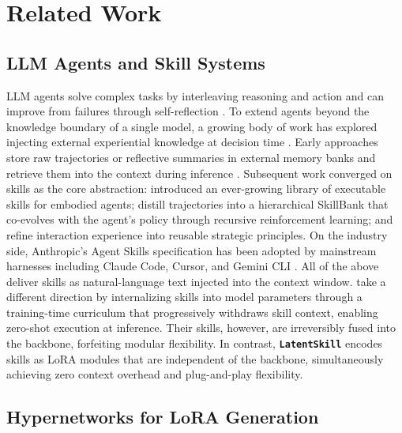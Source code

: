 \documentclass{llmxive}
\providecommand{\textttt}[1]{\texttt{#1}}
\providecommand{\method}{\textbf{\textttt{LatentSkill}}}
\begin{document}
\section{Related Work}
\subsection{LLM Agents and Skill Systems}
 
LLM agents solve complex tasks by interleaving reasoning and action \citep{Yao2023ReAct} and can improve from failures through self-reflection \citep{Shinn2023Reflexion}. To extend agents beyond the knowledge boundary of a single model, a growing body of work has explored injecting external experiential knowledge at decision time \citep{zhou2026externalization}. Early approaches store raw trajectories or reflective summaries in external memory banks and retrieve them into the context during inference \citep{Zhao2024ExpeL, Chhikara2025Mem0}. Subsequent work converged on skills as the core abstraction: \citet{Wang2023Voyager} introduced an ever-growing library of executable skills for embodied agents; \citet{Xia2026SkillRL} distill trajectories into a hierarchical SkillBank that co-evolves with the agent's policy through recursive reinforcement learning; and \citet{Wu2025EvolveR} refine interaction experience into reusable strategic principles.  On the industry side, Anthropic's Agent Skills specification has been adopted by mainstream harnesses including Claude Code, Cursor, and Gemini CLI \citep{SkillsBench2026, yang2025surveyaiagentprotocols}. All of the above deliver skills as natural-language text injected into the context window. \citet{Lu2026Skill0} take a different direction by internalizing skills into model parameters through a training-time curriculum that progressively withdraws skill context, enabling zero-shot execution at inference. Their skills, however, are irreversibly fused into the backbone, forfeiting modular flexibility. In contrast, \method{} encodes skills as LoRA modules that are independent of the backbone, simultaneously achieving zero context overhead and plug-and-play flexibility.
 
\subsection{Hypernetworks for LoRA Generation}
 
\end{document}
